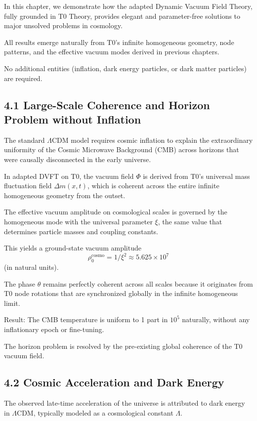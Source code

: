 	In this chapter, we demonstrate how the adapted Dynamic Vacuum Field Theory, fully grounded in T0 Theory, provides elegant and parameter-free solutions to major unsolved problems in cosmology.
	
	All results emerge naturally from T0's infinite homogeneous geometry, node patterns, and the effective vacuum modes derived in previous chapters.
	
	No additional entities (inflation, dark energy particles, or dark matter particles) are required.
	
	\subsection{4.1 Large-Scale Coherence and Horizon Problem without Inflation}
	
	The standard $\Lambda$CDM model requires cosmic inflation to explain the extraordinary uniformity of the Cosmic Microwave Background (CMB) across horizons that were causally disconnected in the early universe.
	
	In adapted DVFT on T0, the vacuum field $\Phi$ is derived from T0's universal mass fluctuation field $\Delta m(x,t)$, which is coherent across the entire infinite homogeneous geometry from the outset.
	
	The effective vacuum amplitude on cosmological scales is governed by the homogeneous mode with the universal parameter $\xi$, the same value that determines particle masses and coupling constants.
	
	This yields a ground-state vacuum amplitude
	\[
	\rho_0^{\text{cosmo}} = 1 / \xi^2 \approx 5.625 \times 10^7
	\]
	(in natural units).
	
	The phase $\theta$ remains perfectly coherent across all scales because it originates from T0 node rotations that are synchronized globally in the infinite homogeneous limit.
	
	Result: The CMB temperature is uniform to 1 part in $10^5$ naturally, without any inflationary epoch or fine-tuning.
	
	The horizon problem is resolved by the pre-existing global coherence of the T0 vacuum field.
	
	\subsection{4.2 Cosmic Acceleration and Dark Energy}
	
	The observed late-time acceleration of the universe is attributed to dark energy in $\Lambda$CDM, typically modeled as a cosmological constant $\Lambda$.
	

